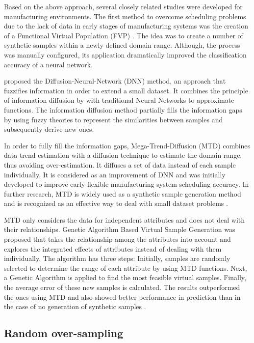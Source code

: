 \documentclass[parskip=full]{scrartcl}
\begin{document}
Based on the above approach, several closely related studies were developed for
manufacturing environments. The first method to overcome scheduling problems due
to the lack of data in early stages of manufacturing systems was the creation of
a Functional Virtual Population (FVP) \cite{Li.2003}. The idea was to create a
number of synthetic samples within a newly defined domain range. Although, the
process was manually configured, its application dramatically improved the
classification accuracy of a neural network. 

\cite{Huang.2004} proposed the Diffusion-Neural-Network (DNN) method, an
approach that fuzzifies information in order to extend a small dataset. It
combines the principle of information diffusion by \cite{Huang.1997} with
traditional Neural Networks to approximate functions. The information diffusion
method partially fills the information gaps by using fuzzy theories to represent
the similarities between samples and subsequently derive new ones.

In order to fully fill the information gaps, Mega-Trend-Diffusion (MTD)
\cite{Li.2007} combines data trend estimation with a diffusion technique to
estimate the domain range, thus avoiding over-estimation. It diffuses a set of
data instead of each sample individually. It is considered as an improvement of
DNN and was initially developed to improve early flexible manufacturing system
scheduling accuracy. In further research, MTD is widely used as a synthetic
sample generation method and is recognized as an effective way to deal with
small dataset problems \cite{AbdulLateh.2017}.

MTD only considers the data for independent attributes and does not deal with
their relationships. Genetic Algorithm Based Virtual Sample Generation was
proposed that takes the relationship among the attributes into account and
explores the integrated effects of attributes instead of dealing with them
individually. The algorithm has three steps: Initially, samples are randomly
selected to determine the range of each attribute by using MTD functions. Next,
a Genetic Algorithm is applied to find the most feasible virtual samples.
Finally, the average error of these new samples is calculated. The results
outperformed the ones using MTD and also showed better performance in prediction
than in the case of no generation of synthetic samples \cite{Li.2014}.

\subsection{Random over-sampling}
\end{document}
